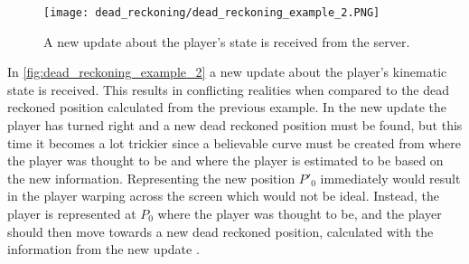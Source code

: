 \begin{figure}[H]
    \centering
    \texttt{[image: dead\_reckoning/dead\_reckoning\_example\_2.PNG]}
    \caption{A new update about the player's state is received from the server.}
    \label{fig:dead_reckoning_example_2}
\end{figure}
\noindent
In \autoref{fig:dead_reckoning_example_2} a new update about the player's kinematic state is received. 
This results in conflicting realities when compared to the dead reckoned position calculated from the previous example. 
In the new update the player has turned right and a new dead reckoned position must be found, but this time it becomes a lot trickier since a believable curve must be created from where the player was thought to be and where the player is estimated to be based on the new information.
Representing the new position $P'_0$ immediately would result in the player warping across the screen which would not be ideal.
Instead, the player is represented at $ P_0 $ where the player was thought to be, and the player should then move towards a new dead reckoned position, calculated with the information from the new update \autocite{DeadReckoning}.


